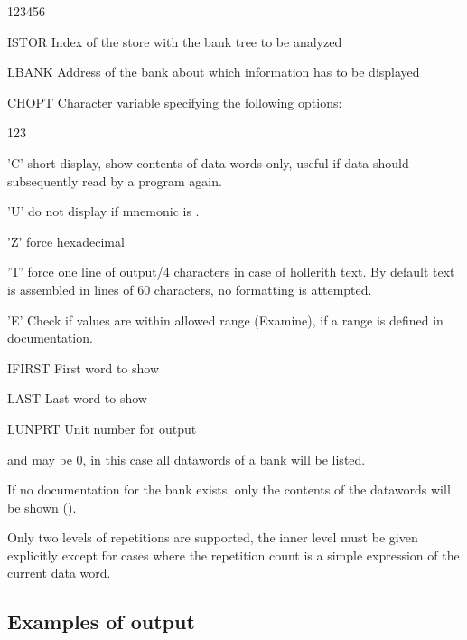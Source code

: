 \begin{DLtt}{123456}
\item[ISTOR]  Index of the store with the bank tree to be analyzed
\item[LBANK]  Address of the bank about which information has to be displayed
\item[CHOPT]  Character variable specifying the following options:
  \begin{DLtt}{123}
     \item['C'] short display, show contents of data words only,
                useful if data should subsequently read by a program again.
     \item['U'] do not display if mnemonic is .
     \item['Z'] force hexadecimal
     \item['T'] force one line of output/4 characters in case of
                hollerith text. By default text is assembled in lines
                of 60 characters, no formatting is attempted.
     \item['E'] Check if values are within allowed range (Examine), if
                a range is defined in documentation.
  \end{DLtt}
\item[IFIRST] First word to show
\item[LAST]   Last word to show
\item[LUNPRT] Unit number for output
\end{DLtt}
 
\begin{Notes}
\item {} and  may be 0, in this case all datawords
      of a bank will be listed. 
\item If no documentation for the bank exists, only the contents of the 
      datawords will be shown ().
\item Only two levels of repetitions are supported, the inner level
      must be given explicitly except for cases where the repetition count
      is a simple expression of the current data word.
\end{Notes}
 
\newpage
 
\subsection[Examples of {\tt DZDISP} output]{Examples of  output}
 
